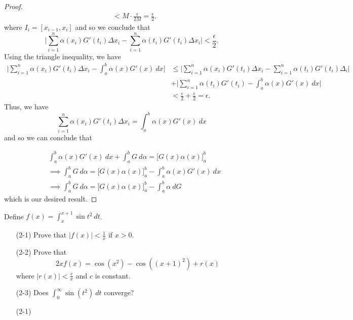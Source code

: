 \documentclass[a4paper]{article}
\begin{document}
\begin{proof}
\begin{align*}
                                                                                                                                                 &< M \cdot \frac{ \epsilon }{ 2 M  } = \frac{ \epsilon }{ 2 }.
\end{align*}
where \( {I}_{i} = [{x}_{i-1}, {x}_{i}] \) and so we conclude that
\[  \Big| \sum_{ i=1  }^{ n } \alpha({x}_{i}) G'({t}_{i}) \Delta {x}_{i} - \sum_{ i=1  }^{ n } \alpha({t}_{i}) G'({t}_{i}) \Delta {x}_{i}  \Big|  < \frac{ \epsilon }{ 2 }. \]
Using the triangle inequality, we have 
\begin{align*}
    \Big| \sum_{ i=1  }^{ n } \alpha({x}_{i}) G'({t}_{i}) \Delta {x}_{i} - \int_{ a }^{ b }  \alpha(x) G'(x) \ dx  \Big| &\leq \Big| \sum_{ i=1  }^{ n } \alpha({x}_{i}) G'({t}_{i}) \Delta {x}_{i} - \sum_{ i=1  }^{ n } \alpha({t}_{i}) G'({t}_{i}) \Delta {}_{i} \Big| \\  &+ \Big| \sum_{ i=1  }^{ n } \alpha({t}_{i}) G'({t}_{i}) - \int_{ a }^{ b }  \alpha(x) G'(x) \ dx  \Big|  \\
                                                                                                                         &< \frac{ \epsilon }{ 2 }  + \frac{ \epsilon }{ 2 } = \epsilon.
\end{align*}
Thus, we have 
\[  \sum_{ i=1  }^{ n } \alpha({x}_{i}) G'({t}_{i}) \Delta {x}_{i} = \int_{ a }^{ b }  \alpha(x) G'(x) \ dx  \]
and so we can conclude that 

\begin{align*}
&\int_{ a }^{ b }  \alpha(x) G'(x) \ dx + \int_{ a }^{ b }  G  \ d \alpha = \Big[ G(x) \alpha(x) \Big]_{a}^{b} \\ 
&\implies \int_{ a }^{ b }  G  \ d \alpha = \Big[G(x) \alpha(x) \Big]_{a}^{b} - \int_{ a }^{ b }  \alpha(x) G'(x) \ dx \\
&\implies \int_{ a }^{ b } G \ d \alpha = \Big[G(x) \alpha(x)\Big]_{a}^{b} - \int_{ a }^{ b }  \alpha  \ d G
\end{align*}
which is our desired result.
\end{proof}

\begin{problem}
    Define \( f(x) = \int_{ x }^{ x + 1  }  \sin t^{2} \ dt  \). 
    \begin{enumerate}
        \item[(2-1)] Prove that \( | f(x)  |  < \frac{ 1 }{ x }   \) if \( x > 0  \).
        \item[(2-2)] Prove that 
            \[ 2x f(x) = \cos (x^{2}) - \cos ((x+1)^{2}) + r(x)  \]
            where \( | r(x) |  < \frac{ c  }{  x  }   \) and \( c  \) is constant.
        \item[(2-3)] Does \( \displaystyle \int_{ 0 }^{  \infty   }  \sin (t^{2}) \ dt  \) converge? 
    \end{enumerate}
\end{problem}

\begin{enumerate}
    \item[(2-1)]
\end{enumerate}
\end{document}
